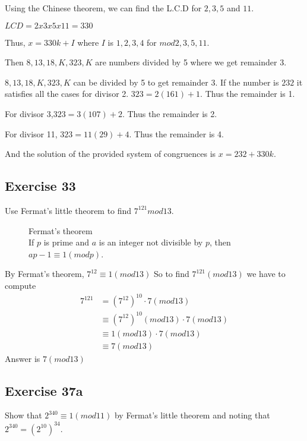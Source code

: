 \documentclass[12pt]{article}
\begin{document}
    Using the Chinese theorem, we can find the L.C.D for $2,3,5$ and $11$.
  
    $LCD = 2x3x5x11=330$

    Thus, $x = 330k+I$ where $I$ is $1,2,3,4$ for $mod 2,3,5,11$.

    Then $8,13,18,K,323,K$ are numbers divided by 5 where we get remainder 3.



    $8,13,18,K,323,K$ can be divided by 5 to get remainder 3.
    If the number is $232$ it satisfies all the cases for divisor 2.
    $323 = 2(161)+1$.
    Thus the remainder is 1.
    
    For divisor 3,$323 = 3(107)+2$.
    Thus the remainder is 2.
    
    For divisor 11,
    $323=11(29)+4$.
    Thus the remainder is 4.
    
    And the solution of the provided system of congruences is $x = 232 + 330k$.
    
    \subsection{Exercise 33}
    Use Fermat’s little theorem to find $7^{121} mod 13$.

    \begin{figure}[h]
      \label{theorem:fermat}
      \centering    
      Fermat’s theorem\\
      If $p$ is prime and $a$ is an integer not divisible by $p$, then $ap-1\equiv 1 (mod p)$.\\
    \end{figure}

By Fermat’s theorem,
$7^{12} \equiv 1(mod13)$
So to find $7^{121}(mod13)$ we have to compute
\begin{equation}
  \begin{split}
    7^{121}&=(7^{12})^{10}\cdot 7(mod13)\\
    &\equiv (7^{12})^{10}(mod13)\cdot 7(mod13)\\
    &\equiv 1(mod13)\cdot7(mod13)\\
    &\equiv 7(mod13)
  \end{split}
\end{equation}
Answer is $7(mod13)$

\subsection{Exercise 37a}
    Show that $2^{340} \equiv 1 (mod 11)$ by Fermat’s little theorem and noting that $2^{340} = (2^{10})^{34}$.
\end{document}
